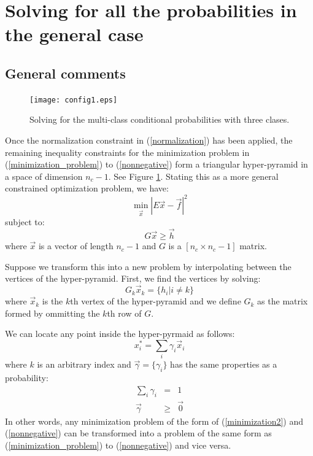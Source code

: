 \documentclass{article}
\newenvironment{eqnnon}{\begin{equation*}}{\end{equation*}}
\newenvironment{eqnarraynon}{\begin{eqnarray*}}{\end{eqnarray*}}
\begin{document}
\section{Solving for all the probabilities in the general case}

\label{general_case_solution}

\subsection{General comments}

\begin{figure}
	\texttt{[image: config1.eps]}
	\caption{Solving for the multi-class conditional probabilities with three clases.}
	\label{config1}
\end{figure}

Once the normalization constraint in (\ref{normalization}) has been applied,
the remaining inequality constraints for the minimization problem in
(\ref{minimization_problem}) to (\ref{nonnegative}) form a triangular
hyper-pyramid in a space of dimension $n_c-1$.
See Figure \ref{config1}.
Stating this as a more general constrained optimization problem, we have:
\begin{equation}
	\min_{\vec x} | E \vec x - \vec f |^2
	\label{minimization2}
\end{equation}
subject to:
\begin{equation}
	G \vec x \ge \vec h
	\label{inequality2}
\end{equation}
where $\vec x$ is a vector of length $n_c-1$ 
and $G$ is a $[n_c \times n_c-1]$ matrix.

Suppose we transform this into a new problem by interpolating between the
vertices of the hyper-pyramid.
First, we find the vertices by solving:
\begin{eqnnon}
	G_k \vec x_k = \lbrace h_i | i \ne k \rbrace
\end{eqnnon}
where $\vec x_k$ is the $k$th vertex of the hyper-pyramid and
we define $G_k$ as the matrix formed by ommitting the $k$th row of $G$.

We can locate any point inside the hyper-pyrmaid as follows:
\begin{eqnnon}
	x^*_i = \sum_i \gamma_i \vec x_i
\end{eqnnon}
where $k$ is an arbitrary index 
and $\vec \gamma = \lbrace \gamma_i \rbrace$ has the same properties as a probability:
\begin{eqnarraynon}
	\sum_i \gamma_i & = & 1 \\
	\vec \gamma & \ge & \vec 0
\end{eqnarraynon}
In other words, any minimization problem of the form of (\ref{minimization2})
and (\ref{nonnegative}) can be transformed into a problem of the same form
as (\ref{minimization_problem}) to (\ref{nonnegative}) and vice versa.
\end{document}
